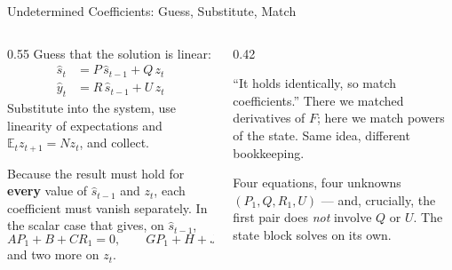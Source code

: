 \begin{frame}{Undetermined Coefficients: Guess, Substitute, Match}
\begin{columns}[T]
\begin{column}{0.55\textwidth}
\small
Guess that the solution is linear:
\begin{align*}
 \hat{s}_t &= P\,\hat{s}_{t-1} + Q\,z_t\\
 \hat{y}_t &= R\,\hat{s}_{t-1} + U\,z_t
\end{align*}
Substitute into the system, use linearity of expectations and $\mathbb{E}_t z_{t+1}=Nz_t$, and collect.
\medskip

Because the result must hold for \textbf{every} value of $\hat{s}_{t-1}$ and $z_t$, each coefficient must vanish separately. In the scalar case that gives, on $\hat{s}_{t-1}$,
\[
  AP_1+B+CR_1=0,\qquad GP_1+H+JR_1P_1+KR_1=0,
\]
and two more on $z_t$.
\end{column}
\begin{column}{0.42\textwidth}
\begin{conceptbox}[title=\textbf{The same trick as 5.A3}]\small
``It holds identically, so match coefficients.'' There we matched derivatives of $F$; here we match powers of the state. Same idea, different bookkeeping.
\end{conceptbox}
\medskip
\begin{takeawaybox}\footnotesize
Four equations, four unknowns $(P_1,Q,R_1,U)$ --- and, crucially, the first pair does \emph{not} involve $Q$ or $U$. The state block solves on its own.
\end{takeawaybox}
\end{column}
\end{columns}
\vspace{1mm}
\end{frame}

